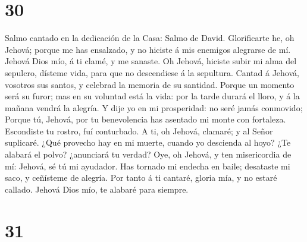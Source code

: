 \hypertarget{section-29}{%
\section{30}\label{section-29}}

 Salmo cantado en la dedicación de la Casa: Salmo de
David. Glorificarte he, oh Jehová; porque me has ensalzado, y no hiciste
á mis enemigos alegrarse de mí.  Jehová Dios mío, á ti
clamé, y me sanaste.  Oh Jehová, hiciste subir mi alma del
sepulcro, dísteme vida, para que no descendiese á la sepultura.
 Cantad á Jehová, vosotros sus santos, y celebrad la
memoria de su santidad.  Porque un momento será su furor;
mas en su voluntad está la vida: por la tarde durará el lloro, y á la
mañana vendrá la alegría.  Y dije yo en mi prosperidad: no
seré jamás conmovido;  Porque tú, Jehová, por tu
benevolencia has asentado mi monte con fortaleza. Escondiste tu rostro,
fuí conturbado.  A ti, oh Jehová, clamaré; y al Señor
suplicaré.  ¿Qué provecho hay en mi muerte, cuando yo
descienda al hoyo? ¿Te alabará el polvo? ¿anunciará tu verdad?
 Oye, oh Jehová, y ten misericordia de mí: Jehová, sé tú
mi ayudador.  Has tornado mi endecha en baile; desataste
mi saco, y ceñísteme de alegría.  Por tanto á ti cantaré,
gloria mía, y no estaré callado. Jehová Dios mío, te alabaré para
siempre.

\hypertarget{section-30}{%
\section{31}\label{section-30}}

